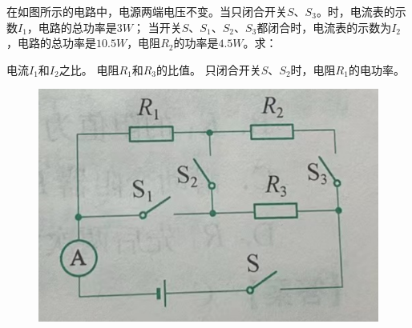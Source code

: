 \documentclass[a4paper,cs4size]{BHCexam}
\begin{document}
\begin{groups}
\begin{questions}[]
        \question[5] 在如图所示的电路中，电源两端电压不变。当只闭合开关$S$、$S_3$。时，电流表的示数$I_1$，电路的总功率是$3W$；
        当开关$S$、$S_1$、$S_2$、$S_3$都闭合时，电流表的示数为$I_2$，电路的总功率是$10.5W$，电阻$R_2$的功率是$4.5W$。求：
        \begin{subquestions}
            \subquestion 电流$I_1$和$I_2$之比。
            \subquestion 电阻$R_1$和$R_3$的比值。
            \subquestion 只闭合开关$S$、$S_2$时，电阻$R_1$的电功率。
        \end{subquestions}
        \begin{figure}[htb]
            \flushright
            \includegraphics [scale=0.4,trim=0 0 0 0]{./image/physics_circuit4_4.png}
            \label{fig:fig_circuit4_4}
        \end{figure}




    \end{questions}





\end{groups}


\label{lastpage}
\end{document}
